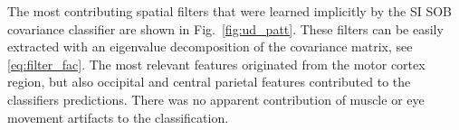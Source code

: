 The most contributing spatial filters that were learned implicitly by the
\ac{SI} \ac{SOB} covariance classifier are shown in Fig.~\ref{fig:ud_patt}.
These filters can be easily extracted with an eigenvalue decomposition of the
covariance matrix, see \eqref{eq:filter_fac}. The most relevant features
originated from the motor cortex region, but also occipital and central
parietal features contributed to the classifiers predictions. There was no
apparent contribution of muscle or eye movement artifacts to the
classification.
